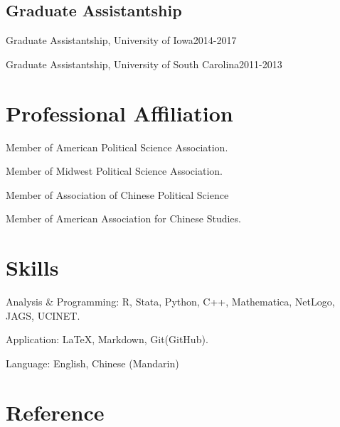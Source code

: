 \documentclass[10.5pt,]{article}
\providecommand{\tightlist}{%
	\setlength{\itemsep}{0pt}\setlength{\parskip}{0pt}}
\renewenvironment{itemize}{
	\begin{list}{}{
			\setlength{\leftmargin}{1.5em}
		}
	}{
	\end{list}
}
\begin{document}
\subsection{Graduate Assistantship}\label{graduate-assistantship}

\begin{itemize}
\tightlist
\item
  Graduate Assistantship, University of Iowa\hfill 2014-2017
\item
  Graduate Assistantship, University of South Carolina\hfill 2011-2013
\end{itemize}

\section{Professional Affiliation}\label{professional-affiliation}

\begin{itemize}
\tightlist
\item
  Member of American Political Science Association.
\item
  Member of Midwest Political Science Association.
\item
  Member of Association of Chinese Political Science
\item
  Member of American Association for Chinese Studies.
\end{itemize}

\section{Skills}\label{skills}

\begin{itemize}
\tightlist
\item
  Analysis \& Programming: R, Stata, Python, C++, Mathematica, NetLogo,
  JAGS, UCINET.
\item
  Application: \LaTeX, Markdown, Git(GitHub).
\item
  Language: English, Chinese (Mandarin)
\end{itemize}

\section{Reference}\label{reference}
\end{document}

